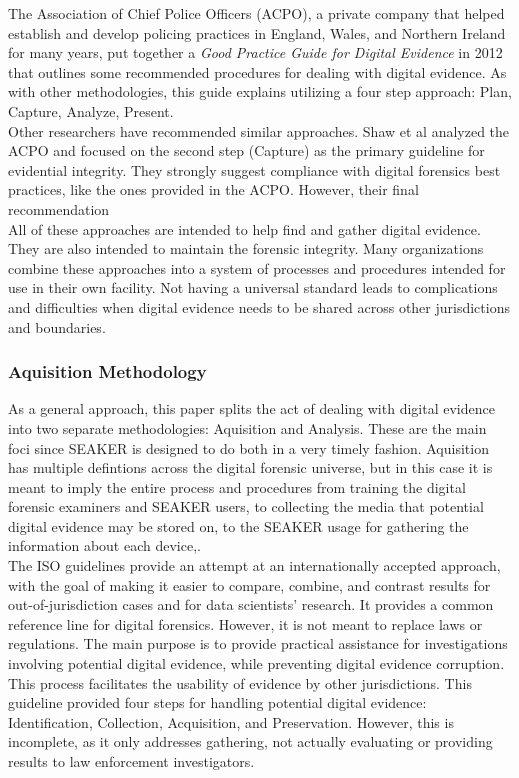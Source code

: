 \documentclass[12pt]{article}
\begin{document}
The Association of Chief Police Officers (ACPO), a private company that helped establish and
develop policing practices in England, Wales, and Northern Ireland for many years,
put together a {\em Good Practice Guide for Digital Evidence}\cite{williams2012acpo} in 2012 that outlines some
recommended procedures for dealing with digital evidence.  As with other methodologies, this guide
explains utilizing a four step approach: Plan, Capture, Analyze, Present.\\

Other researchers have recommended similar approaches.
Shaw et al\cite{shaw2013practical} analyzed the ACPO and focused on the second step (Capture)
as the primary guideline for evidential integrity.  They strongly suggest compliance with
digital forensics best practices, like the ones provided in the ACPO.  However, their final 
recommendation \\

All of these approaches are intended to help find and gather digital evidence.  They are also intended
to maintain the forensic integrity.  Many organizations combine these approaches into a system of
processes and procedures intended for use in their own facility.  Not having a universal standard 
leads to complications and difficulties when digital evidence needs to be shared across other
jurisdictions and boundaries\cite{ajijola2014review}.\\

\subsubsection{Aquisition Methodology}

As a general approach, this paper splits the act of dealing with digital evidence into two
separate methodologies: Aquisition and Analysis.  These are the main foci since SEAKER is 
designed to do both in a very timely fashion.  Aquisition has multiple defintions across
the digital forensic universe, but in this case it is meant to imply the entire process and
procedures from training the digital forensic examiners and SEAKER users,
to collecting the media that potential digital evidence may be stored on, 
to the SEAKER usage for gathering the information about each device,.\\

The ISO guidelines provide an attempt at an internationally accepted approach, with the goal
of making it easier to compare, combine, and contrast
results for out-of-jurisdiction cases and for data scientists' research.  It provides a
common reference line for 
digital forensics.  However, it is not meant to replace laws or regulations.  The main
purpose is to provide practical
assistance for investigations involving potential digital evidence, while preventing digital
evidence corruption.  This
process facilitates the usability of evidence by other jurisdictions.  This guideline provided
four steps for handling
potential digital evidence: Identification, Collection, Acquisition, and Preservation.  However,
this is incomplete, as
it only addresses gathering, not actually evaluating or providing results to law enforcement
investigators.\\
\end{document}
